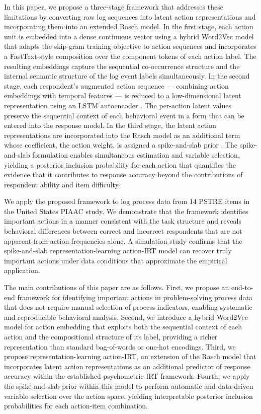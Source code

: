 \documentclass[A4paper,11pt]{article}
\begin{document}
In this paper, we propose a three-stage framework that addresses these limitations by converting raw log sequences into latent action representations and incorporating them into an extended Rasch model. In the first stage, each action unit is embedded into a dense continuous vector using a hybrid Word2Vec model \citep{mikolov2013efficient, mikolov2013distributed} that adapts the skip-gram training objective to action sequences and incorporates a FastText-style composition \citep{bojanowski2017enriching} over the component tokens of each action label. The resulting embeddings capture the sequential co-occurrence structure and the internal semantic structure of the log event labels simultaneously. In the second stage, each respondent's augmented action sequence --- combining action embeddings with temporal features --- is reduced to a low-dimensional latent representation using an LSTM autoencoder \citep{hochreiter1997long, hinton2006reducing}. The per-action latent values preserve the sequential context of each behavioral event in a form that can be entered into the response model. In the third stage, the latent action representations are incorporated into the Rasch model as an additional term whose coefficient, the action weight, is assigned a spike-and-slab prior \citep{mitchellbeauchamp1988, george1993variable}. The spike-and-slab formulation enables simultaneous estimation and variable selection, yielding a posterior inclusion probability for each action that quantifies the evidence that it contributes to response accuracy beyond the contributions of respondent ability and item difficulty.

We apply the proposed framework to log process data from 14 PSTRE items in the United States PIAAC study. We demonstrate that the framework identifies important actions in a manner consistent with the task structure and reveals behavioral differences between correct and incorrect respondents that are not apparent from action frequencies alone. A simulation study confirms that the spike-and-slab representation-learning action-IRT model can recover truly important actions under data conditions that approximate the empirical application.

The main contributions of this paper are as follows. First, we propose an end-to-end framework for identifying important actions in problem-solving process data that does not require manual selection of process indicators, enabling systematic and reproducible behavioral analysis. Second, we introduce a hybrid Word2Vec model for action embedding that exploits both the sequential context of each action and the compositional structure of its label, providing a richer representation than standard bag-of-words or one-hot encodings. Third, we propose representation-learning action-IRT, an extension of the Rasch model that incorporates latent action representations as an additional predictor of response accuracy within the established psychometric IRT framework. Fourth, we apply the spike-and-slab prior within this model to perform automatic and data-driven variable selection over the action space, yielding interpretable posterior inclusion probabilities for each action-item combination.
\end{document}
